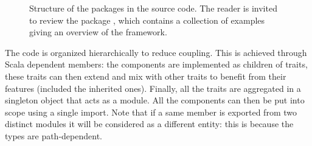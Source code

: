 \begin{figure}[H]
  \centering
  \caption[Source code packages structure]{Structure of the packages in the source code. The reader is invited to review the package , which contains a collection of examples giving an overview of the framework.}
  \label{fig:packages}
\end{figure}

The code is organized hierarchically to reduce coupling. This is achieved through Scala dependent members: the components are implemented as children of traits, these traits can then extend and mix with other traits to benefit from their features (included the inherited ones). Finally, all the traits are aggregated in a singleton object that acts as a module. All the components can then be put into scope using a single import. Note that if a same member is exported from two distinct modules it will be considered as a different entity: this is because the types are path-dependent.


